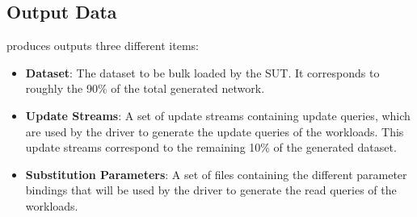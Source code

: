 %
%
%
%
%

\subsection{Output Data}

\datagen produces outputs three different items:
\begin{itemize}
  \item \textbf{Dataset}: The dataset to be bulk loaded by the SUT. It
    corresponds to roughly the 90\% of the total generated network.
  \item \textbf{Update Streams}: A set of update streams containing update
    queries, which are used by the driver to generate the update queries of the
    workloads. This update
    streams correspond to the remaining 10\% of the generated dataset.
  \item \textbf{Substitution Parameters}: A set of files containing the
    different parameter bindings that will be used by the driver to generate the
    read queries of the workloads.
\end{itemize}

